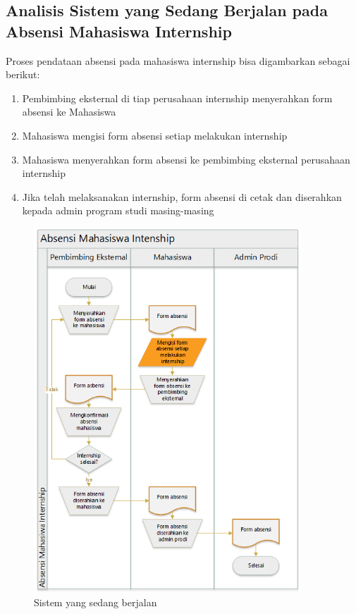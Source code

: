 \subsection{Analisis Sistem yang Sedang Berjalan pada Absensi Mahasiswa Internship}
Proses pendataan absensi pada mahasiswa internship bisa digambarkan sebagai berikut:
\begin{enumerate}
	\item Pembimbing eksternal di tiap perusahaan internship menyerahkan form absensi ke Mahasiswa
	\item Mahasiswa mengisi form absensi setiap melakukan internship
	\item Mahasiswa menyerahkan form absensi ke pembimbing eksternal perusahaan internship
	\item Jika telah melaksanakan internship, form absensi di cetak dan diserahkan kepada admin program studi masing-masing
\end{enumerate}
	\begin{figure}[H]
		\includegraphics[width=10cm]{figures/image019.png}
		\centering
		\caption{Sistem yang sedang berjalan }
	\end{figure}
